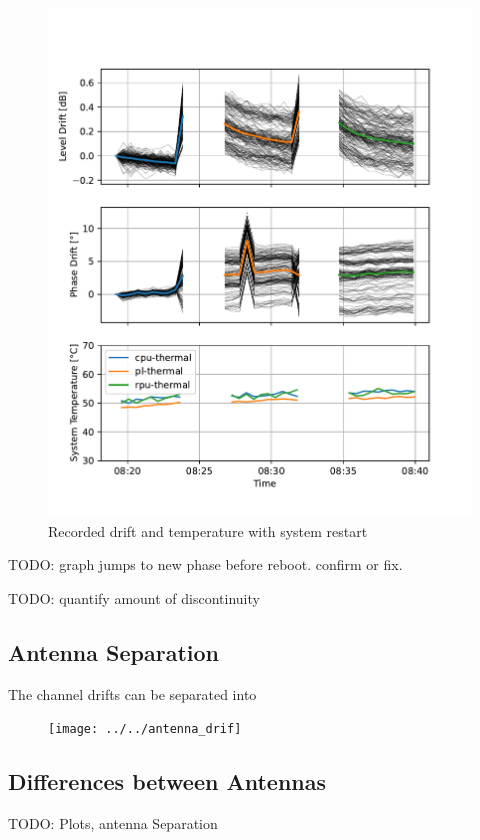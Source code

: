 \begin{figure}
    \centering
    \includegraphics[width=\textwidth]{../figures/meas_23-10-30_reboots_phase_drift.pdf}
    \caption{Recorded drift and temperature with system restart}
    \label{fig:restart}
\end{figure}

TODO: graph jumps to new phase before reboot. confirm or fix.

TODO: quantify amount of discontinuity


\subsection{Antenna Separation}
The channel drifts can be separated into 
\begin{figure}
    \centering
    \texttt{[image: ../../antenna\_drif]}
\end{figure}
\subsection{Differences between Antennas}
TODO: Plots, antenna Separation

